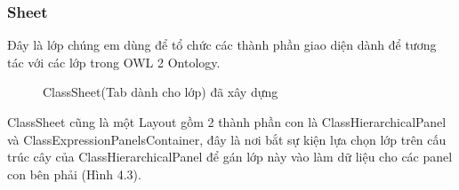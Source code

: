 \subsubsection{Sheet}
Đây là lớp chúng em dùng để tổ chức các thành phần giao diện dành để tương tác với các lớp trong OWL 2 Ontology.
\begin{figure}[h!]
	\centering
	\caption{ClassSheet(Tab dành cho lớp) đã xây dựng\label{overflow}}
\end{figure}
{\let\thefootnote\relax{}}
ClassSheet cũng là một Layout gồm 2 thành phần con là ClassHierarchicalPanel và ClassExpressionPanelsContainer, đây là nơi bắt sự kiện lựa chọn lớp trên cấu trúc cây của ClassHierarchicalPanel để gán lớp này vào làm dữ liệu cho các panel con bên phải (Hình 4.3).
